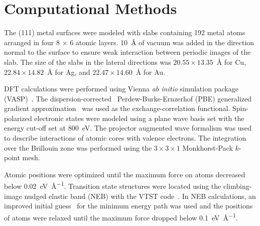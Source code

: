 \section*{Computational Methods}

The (111) metal surfaces were modeled with slabs containing 192 metal atoms arranged in four 8 $\times$ 6 atomic layers. \SI{10}{\angstrom} of vacuum was added in the direction normal to the surface to ensure weak interaction between periodic images of the slab. The size of the slabs in the lateral directions was $20.55 \times 13.35$~\si{\angstrom} for Cu, $22.84 \times 14.82$~\si{\angstrom} for Ag, and $22.47 \times 14.60$~\si{\angstrom} for Au.

DFT calculations were performed using Vienna \emph{ab initio} simulation package (VASP)~\cite{ullmann_131, ullmann_132, ullmann_133, ullmann_134}. The dispersion-corrected~\cite{ullmann_136, ullmann_137} Perdew-Burke-Ernzerhof (PBE) generalized gradient approximation~\cite{ullmann_139} was used as the exchange-correlation functional. 
Spin-polarized electronic states were modeled using a plane wave basis set with the energy cut-off set at \SI{800}{\electronvolt}.
The projector augmented wave formalism was used to describe interactions of atomic cores with valence electrons. The integration over the Brillouin zone was performed using the $3\times 3 \times1$ Monkhorst-Pack $k$-point mesh. 

Atomic positions were optimized until the maximum force on atoms decreased below \SI{0.02}{\electronvolt\per\angstrom}. 
Transition state structures were located using the climbing-image nudged elastic band (NEB) with the VTST code~\cite{ullmann_59}. 
In NEB calculations, an improved initial guess~\cite{ullmann_60, ullmann_99} for the minimum energy path was used and the positions of atoms were relaxed until the maximum force dropped below \SI{0.1}{\electronvolt\per\angstrom}.

